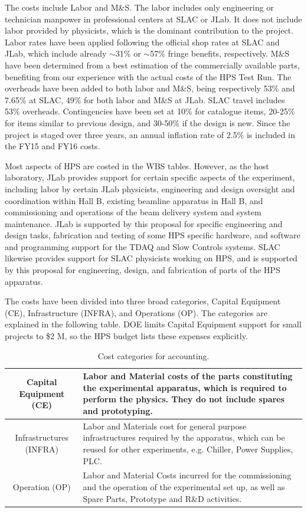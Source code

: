 The costs include Labor and M\&S. The labor includes only engineering or technician manpower in professional centers at SLAC or JLab. It does not 
include labor provided by physicists, which is the dominant contribution to the project. Labor rates have been applied following 
the official shop rates at SLAC and JLab, which include already $\sim$31\% or $\sim$57\% fringe benefits, respectively. M\&S have been determined from a best estimation 
of the commercially available parts,  benefiting from our experience with the actual costs of the HPS Test Run. The overheads have been added to both labor 
and M\&S, being respectively 53\% and 7.65\% at SLAC, 49\% for both labor and M\&S at JLab. SLAC travel includes 53\% overheads. 
Contingencies have been set at 10\% for catalogue items,  20-25\% for items similar to previous design, and 30-50\%  if the design is new.
Since the project is staged 
over three years, an annual inflation rate of 2.5\%  is included in the FY15 and FY16 costs.

Most aspects of HPS are costed in the WBS tables. However, as the host laboratory, JLab provides
support for certain specific aspects of the experiment, including labor by certain JLab physicists, engineering and design
oversight and coordination within Hall B, existing beamline apparatus in Hall B, and commissioning and operations of the beam
delivery system and system maintenance. JLab is supported by this proposal for specific engineering and design
tasks, fabrication and testing of some HPS specific hardware, and software and programming support for the TDAQ and Slow Controls
systems. SLAC likewise provides support for SLAC physicists working on HPS, and is supported by this proposal
for engineering, design, and fabrication of parts of the HPS apparatus.

The costs have been divided into three broad categories, Capital Equipment (CE), Infrastructure (INFRA), and Operations (OP). 
The categories are explained in the following table. DOE limits Capital Equipment support for small projects to \$2 M, so the HPS budget lists these
expenses explicitly.

\begin{table}[htdp]
\caption{Cost categories for accounting.}
\begin{center}
\begin{tabular}{|c|p{4 in}|}
\hline
Capital Equipment
(CE)
&
Labor and Material costs of the parts constituting the experimental apparatus,
which is required to perform the physics. They do not include spares and
prototyping.
\\
\hline
Infrastructures
(INFRA)
&
Labor and Materials cost for general purpose infrastructures required by the
apparatus, which can be reused for other experiments, e.g. Chiller, Power
Supplies, PLC.
\\
\hline
Operation (OP)
&
Labor and Material Costs incurred for the commissioning and the operation of the
experimental set up, as well as Spare Parts, Prototype and R\&D activities.
\\
\hline
\end{tabular}
\end{center}
\label{tb:costcats}
\end{table}

